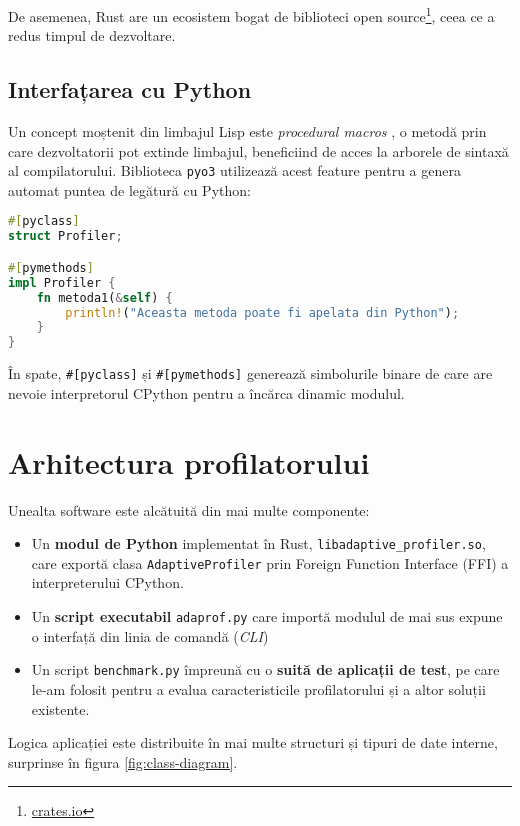 De asemenea, Rust are un ecosistem bogat de biblioteci open source\footnote{\href{https://crates.io/}{crates.io}}, ceea ce a redus timpul de dezvoltare.

\subsection*{Interfațarea cu Python}

Un concept moștenit din limbajul Lisp este \emph{procedural macros} \cite{lisp_macros}, o metodă prin care dezvoltatorii pot extinde limbajul, beneficiind de acces la arborele de sintaxă al compilatorului. Biblioteca \texttt{pyo3} utilizează acest feature pentru a genera automat puntea de legătură cu Python:

\begin{lstlisting}[language=Rust]
#[pyclass]
struct Profiler;

#[pymethods]
impl Profiler {
    fn metoda1(&self) {
        println!("Aceasta metoda poate fi apelata din Python");
    }
}
\end{lstlisting}

În spate, \texttt{\#[pyclass]} și \texttt{\#[pymethods]} generează simbolurile binare de care are nevoie interpretorul CPython pentru a încărca dinamic modulul.

\section{Arhitectura profilatorului}

Unealta software este alcătuită din mai multe componente:

\begin{itemize}
    \item Un \textbf{modul de Python} implementat în Rust, \texttt{libadaptive\_profiler.so}, care exportă clasa \texttt{AdaptiveProfiler} prin Foreign Function Interface (FFI) a interpreterului CPython.
    \item Un \textbf{script executabil} \texttt{adaprof.py} care importă modulul de mai sus expune o interfață din linia de comandă (\textit{CLI})
    \item Un script \texttt{benchmark.py} împreună cu o \textbf{suită de aplicații de test}, pe care le-am folosit pentru a evalua caracteristicile profilatorului și a altor soluții existente.
\end{itemize}

Logica aplicației este distribuite în mai multe structuri și tipuri de date interne, surprinse în figura \ref{fig:class-diagram}.


